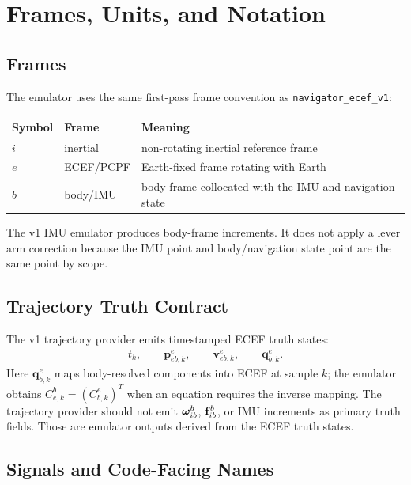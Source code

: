 \chapter{Frames, Units, and Notation}

\section{Frames}

The emulator uses the same first-pass frame convention as
\texttt{navigator\_ecef\_v1}:

\begin{center}
\begin{tabular}{lll}
\toprule
Symbol & Frame & Meaning \\
\midrule
$i$ & inertial & non-rotating inertial reference frame \\
$e$ & ECEF/PCPF & Earth-fixed frame rotating with Earth \\
$b$ & body/IMU & body frame collocated with the IMU and navigation state \\
\bottomrule
\end{tabular}
\end{center}

The v1 IMU emulator produces body-frame increments. It does not apply a lever
arm correction because the IMU point and body/navigation state point are the
same point by scope.

\section{Trajectory Truth Contract}

The v1 trajectory provider emits timestamped ECEF truth states:
\begin{align}
t_k, \qquad
\mathbf{p}_{eb,k}^{e}, \qquad
\mathbf{v}_{eb,k}^{e}, \qquad
\mathbf{q}_{b,k}^{e}.
\label{eq:imu_trajectory_truth_contract}
\end{align}
Here $\mathbf{q}_{b,k}^{e}$ maps body-resolved components into ECEF at sample $k$;
the emulator obtains $C_{e,k}^{b}=\left(C_{b,k}^{e}\right)^T$ when an equation
requires the inverse mapping. The trajectory provider should not emit
$\boldsymbol{\omega}_{ib}^{b}$, $\mathbf{f}_{ib}^{b}$, or IMU increments as primary truth fields.
Those are emulator outputs derived from the ECEF truth states.

\section{Signals and Code-Facing Names}

